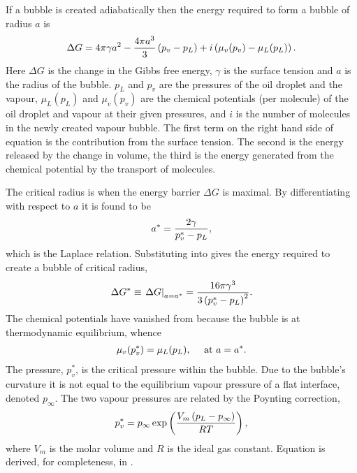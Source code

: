 If a bubble is created adiabatically then the energy required to form a bubble of radius $a$ is  \cite{Delale2003, Katz1973}
\begin{align}
  \Delta G =4\pi \gamma  a^2 - \frac{4\pi a^3}{3}\left( p_v - p_L \right) + i\left( \mu_v(p_v) - \mu_L(p_L) \right).\label{eqn:DeltaG}
\end{align}
Here $\Delta G$ is the change in the Gibbs free energy, $\gamma$ is the surface tension and $a$ is the radius of the bubble.
$p_L$ and $p_v$ are the pressures of the oil droplet and the vapour,
 $\mu_L(p_L)$ and $\mu_v(p_v)$ are the chemical potentials (per molecule) of the oil droplet and vapour
at their given pressures,
and $i$ is the number of molecules in the newly created vapour bubble.
The first term on the right hand side of equation  is the contribution from the surface tension.
The second is the energy released by the change in volume,
the third is the energy generated from  the chemical potential by the transport of molecules.

The critical radius is  when the energy  barrier $\Delta G$ is maximal.
By differentiating  with respect to $a$ it is found to be
\begin{align}
  {a^\ast} = \frac{2\gamma}{p_v^\ast-p_L}, \label{eqn:LaplaceRelation}
\end{align}
which is the Laplace relation.
Substituting  into  gives the energy required to create a bubble of  critical radius,
\begin{align}
   \Delta G^\ast \equiv \left.{\Delta G}\right|_{a = {a^\ast}} = \frac{16\pi\gamma^3}{3\left( p_v^\ast- p_L \right)^2}.\label{eqn:DeltaGStar}
\end{align}
The chemical potentials have vanished from  because  the bubble is at thermodynamic equilibrium, whence
\begin{align}
  \mu_v(p_v^\ast) = \mu_L(p_L),\label{eqn:thermoEqlbm} \quad\text{ at $a = {a^\ast}$.}
\end{align} 
The pressure, $p_v^\ast$, is the critical pressure within the bubble.
Due to the bubble's curvature  it is not equal to the equilibrium vapour pressure of a flat interface, 
denoted $p_\infty$. %
The two vapour pressures are related by the Poynting correction, 
\begin{align}
  p_v^\ast = p_\infty \exp \left(  \frac{V_m\left( p_L -p_\infty \right) }{R T}   \right),\label{eqn:PoyntingCorrection}
\end{align}
where $V_m$ is the molar volume  and $R$ is the ideal gas constant.
Equation  is derived, for completeness, in  .


